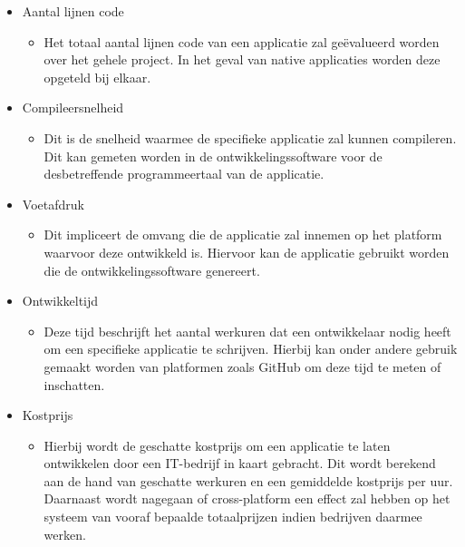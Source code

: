 \begin{itemize}
    \item Aantal lijnen code
    \begin{itemize}
        \item Het totaal aantal lijnen code van een applicatie zal geëvalueerd worden over het gehele project. In het geval van native applicaties worden deze opgeteld bij elkaar.
    \end{itemize}
    \item Compileersnelheid
    \begin{itemize}
        \item Dit is de snelheid waarmee de specifieke applicatie zal kunnen compileren. Dit kan gemeten worden in de ontwikkelingssoftware voor de desbetreffende programmeertaal van de applicatie.
    \end{itemize}
    \item Voetafdruk
    \begin{itemize}
        \item Dit impliceert de omvang die de applicatie zal innemen op het platform waarvoor deze ontwikkeld is. Hiervoor kan de applicatie gebruikt worden die de ontwikkelingssoftware genereert.
    \end{itemize}
    \item Ontwikkeltijd
    \begin{itemize}
        \item Deze tijd beschrijft het aantal werkuren dat een ontwikkelaar nodig heeft om een specifieke applicatie te schrijven. Hierbij kan onder andere gebruik gemaakt worden van platformen zoals GitHub om deze tijd te meten of inschatten.
    \end{itemize}
    \item Kostprijs
    \begin{itemize}
        \item Hierbij wordt de geschatte kostprijs om een applicatie te laten ontwikkelen door een IT-bedrijf in kaart gebracht. Dit wordt berekend aan de hand van geschatte werkuren en een gemiddelde kostprijs per uur. Daarnaast wordt nagegaan of cross-platform een effect zal hebben op het systeem van vooraf bepaalde totaalprijzen indien bedrijven daarmee werken.
    \end{itemize}
\end{itemize}